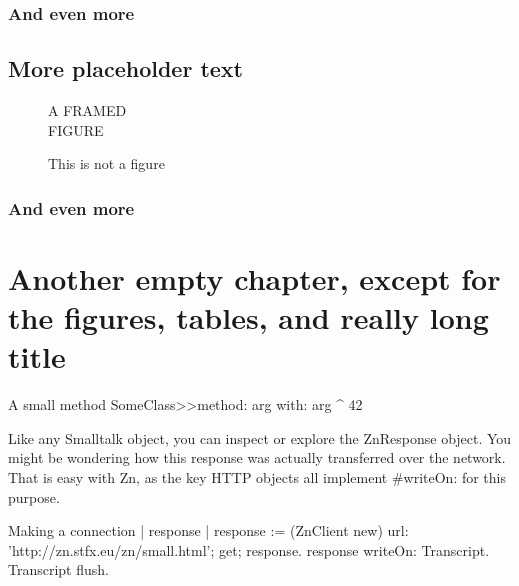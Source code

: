 \documentclass{sbabook}
\begin{document}
\textlatin{\lipsum[3]}


\subsection{And even more}

\textlatin{\lipsum[4]}


\section{More placeholder text}

\textlatin{\lipsum[3]}

\begin{figure}
    A FRAMED\\
    FIGURE
    \caption{This is not a figure}
\end{figure}


\subsection{And even more}

\textlatin{\lipsum[4]}



\chapter{Another empty chapter, except for the figures, tables, and really long title}

\begin{leftbar}
    \lipsum[2]
\end{leftbar}

\begin{script}[fortytwo]{A small method}
SomeClass>>method: arg with: arg
    ^ 42
\end{script}

Like any Smalltalk object, you can inspect or explore the ZnResponse object. You might be wondering how this response was actually transferred over the network. That is easy with Zn, as the key HTTP objects all implement \#writeOn: for this purpose.

\begin{script}{Making a connection}
| response |
response := (ZnClient new)
  url: 'http://zn.stfx.eu/zn/small.html';
  get;
  response.
response writeOn: Transcript.
Transcript flush.
\end{script}
\end{document}
